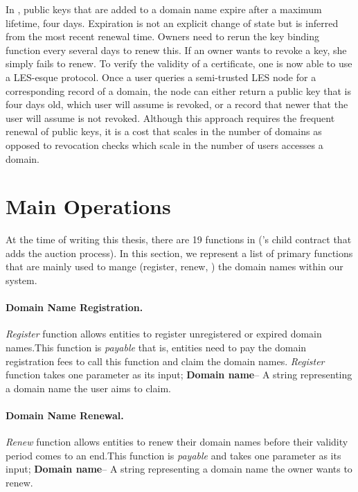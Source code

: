 In \Ghazalstar, public keys that are added to a domain name expire after a maximum lifetime, \eg four days. Expiration is not an explicit change of state but is inferred from the most recent renewal time. Owners need to rerun the key binding function every several days to renew this. If an owner wants to revoke a key, she simply fails to renew. To verify the validity of a certificate, one is now able to use a LES-esque protocol. Once a user queries a semi-trusted LES node for a corresponding record of a domain, the node can either return a public key that is four days old, which user will assume is revoked, or a record that newer that the user will assume is not revoked. Although this approach requires the frequent renewal of public keys, it is a cost that scales in the number of domains as opposed to revocation checks which scale in the number of users accesses a domain. 

\section{\Ghazal Main Operations}
At the time of writing this thesis, there are 19 functions in \Ghazalstar (\Ghazal's child contract that adds the auction process). In this section, we represent a list of primary functions that are mainly used to mange (\eg register, renew, \etc) the domain names within our system.

\paragraph{Domain Name Registration.}

\emph{Register} function allows entities to register unregistered or expired domain names.This function is \emph{payable} that is, entities need to pay the domain registration fees to call this function and claim the domain names. \emph{Register} function takes one parameter as its input; \textbf{Domain name}-- A string representing a domain name the user aims to claim.
\paragraph{Domain Name Renewal.}

\emph{Renew} function allows entities to renew their domain names before their validity period comes to an end.This function is \emph{payable} and takes one parameter as its input; \textbf{Domain name}-- A string representing a domain name the owner wants to renew.
